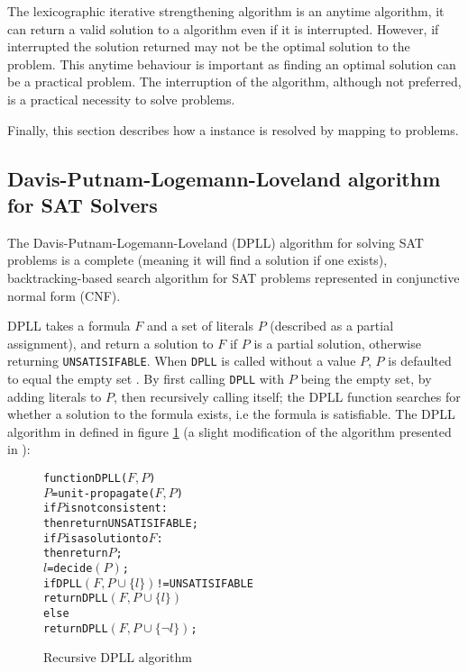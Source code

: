 The lexicographic iterative strengthening algorithm is an anytime algorithm, it can return a valid solution to a \modelimpl algorithm even if it is interrupted.
However, if interrupted the solution returned may not be the optimal solution to the problem.
This anytime behaviour is important as finding an optimal solution can be a practical problem.
The interruption of the algorithm, although not preferred, is a practical necessity to solve \modelimpl problems.

Finally, this section describes how a \modelname instance is resolved by mapping to \modelimpl problems.

\subsection{Davis-Putnam-Logemann-Loveland algorithm for SAT Solvers}
The Davis-Putnam-Logemann-Loveland (DPLL) algorithm \citep{Davis1960, davis1962machine} for solving SAT problems is a complete (meaning it will find a solution if one exists), 
backtracking-based search algorithm for SAT problems represented in conjunctive normal form (CNF).

DPLL takes a formula $F$ and a set of literals $P$ (described as a partial assignment), and return a solution to $F$ if $P$ is a partial solution, 
otherwise returning \verb+UNSATISIFABLE+.
When \texttt{DPLL} is called without a value $P$, $P$ is defaulted to equal the empty set .
By first calling \texttt{DPLL} with $P$ being the empty set, by adding literals to $P$, then recursively calling itself; 
the DPLL function searches for whether a solution to the formula exists, 
i.e the formula is satisfiable.
The DPLL algorithm in defined in figure \ref{impl.DPLL} (a slight modification of the algorithm presented in \citep{dixon2004automating}):
\begin{figure}[h]
\begin{center}
\begin{alltt}
function DPLL(\(F, P\))
   \(P\) = unit-propagate(\(F, P\))
   if \(P\) is not consistent:
       then return UNSATISIFABLE;
   if \(P\) is a solution to \(F\):
       then return \(P\);
   \(l\) = decide\((P)\);
   if DPLL\((F, P \cup \{l\})\) != UNSATISIFABLE 
       return DPLL\((F, P \cup \{l\})\)
   else
       return DPLL\((F, P \cup \{\neg l\})\);
\end{alltt}
  \caption{Recursive DPLL algorithm}
  \label{impl.DPLL}
\end{center}
\end{figure}

